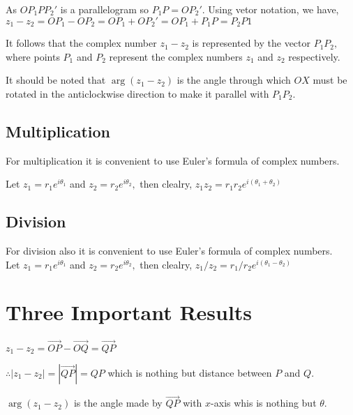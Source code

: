 As $OP_1PP_2'$ is a parallelogram so $P_1P = OP_2'.$ Using vetor notation, we have, $z_1 - z_2 = OP_1 - OP_2 = OP_1 + OP_2' = OP_1 + P_1P = P_2P1$

It follows that the complex number $z_1 - z_2$ is represented by the vector $P_1P_2,$ where points $P_1$ and $P_2$ represent the
complex numbers $z_1$ and $z_2$ respectively.

It should be noted that $\arg(z_1 - z_2)$ is the angle through which $OX$ must be rotated in the anticlockwise direction to make it
parallel with $P_1P_2.$

\subsection{Multiplication}
\startplacefigure[title={Complex numbers subtraction}]
\stopplacefigure
For multiplication it is convenient to use Euler's formula of complex numbers.

Let $z_1 = r_1e^{i\theta_1}$ and $z_2 = r_2e^{i\theta_2},$ then clealry, $z_1z_2 = r_1r_2e^{i(\theta_1 + \theta_2)}$

\subsection{Division}
\startplacefigure[title={Complex numbers division}]
\stopplacefigure
For division also it is convenient to use Euler's formula of complex numbers.\\

Let $z_1 = r_1e^{i\theta_1}$ and $z_2 = r_2e^{i\theta_2},$ then clealry, $z_1/z_2 = r_1/r_2e^{i(\theta_1 - \theta_2)}$

\section{Three Important Results}
\startplacefigure[title={External angle}]
\stopplacefigure

$z_1 - z_2 = \overrightarrow{OP} - \overrightarrow{OQ} = \overrightarrow{QP}$

$\therefore |z_1 - z_2| = |\overrightarrow{QP}| = QP$ which is nothing but distance between $P$ and $Q.$

$\arg(z_1 - z_2)$ is the angle made by $\overrightarrow{QP}$ with $x$-axis whis is nothing but $\theta.$

\startplacefigure[title={Angle relation between three complex numbers}, reference=fig:arbtcn]
\stopplacefigure

